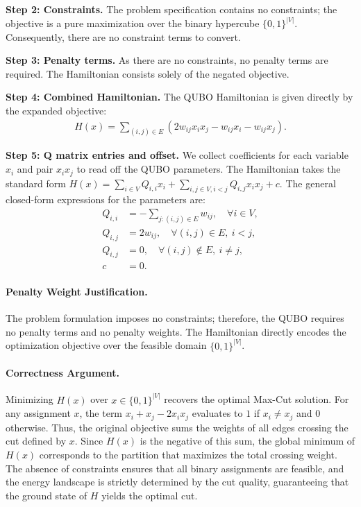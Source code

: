 \documentclass[12pt]{article}
\begin{document}
\textbf{Step 2: Constraints.}
The problem specification contains no constraints; the objective is a pure maximization over the binary hypercube $\{0,1\}^{|V|}$. Consequently, there are no constraint terms to convert.

\textbf{Step 3: Penalty terms.}
As there are no constraints, no penalty terms are required. The Hamiltonian consists solely of the negated objective.

\textbf{Step 4: Combined Hamiltonian.}
The QUBO Hamiltonian is given directly by the expanded objective:
\begin{align}
H(x) = \sum_{(i,j) \in E} \left( 2w_{ij}x_ix_j - w_{ij}x_i - w_{ij}x_j \right).
\end{align}

\textbf{Step 5: Q matrix entries and offset.}
We collect coefficients for each variable $x_i$ and pair $x_ix_j$ to read off the QUBO parameters. The Hamiltonian takes the standard form $H(x) = \sum_{i \in V} Q_{i,i}x_i + \sum_{i,j \in V, i < j} Q_{i,j}x_ix_j + c$. The general closed-form expressions for the parameters are:
\begin{align}
Q_{i,i} &= -\sum_{j : (i,j) \in E} w_{ij}, \quad \forall i \in V, \\
Q_{i,j} &= 2w_{ij}, \quad \forall (i,j) \in E, \ i < j, \\
Q_{i,j} &= 0, \quad \forall (i,j) \notin E, \ i \neq j, \\
c &= 0.
\end{align}

\paragraph{Penalty Weight Justification.}
The problem formulation imposes no constraints; therefore, the QUBO requires no penalty terms and no penalty weights. The Hamiltonian directly encodes the optimization objective over the feasible domain $\{0,1\}^{|V|}$.

\paragraph{Correctness Argument.}
Minimizing $H(x)$ over $x \in \{0,1\}^{|V|}$ recovers the optimal Max-Cut solution. For any assignment $x$, the term $x_i + x_j - 2x_ix_j$ evaluates to $1$ if $x_i \neq x_j$ and $0$ otherwise. Thus, the original objective sums the weights of all edges crossing the cut defined by $x$. Since $H(x)$ is the negative of this sum, the global minimum of $H(x)$ corresponds to the partition that maximizes the total crossing weight. The absence of constraints ensures that all binary assignments are feasible, and the energy landscape is strictly determined by the cut quality, guaranteeing that the ground state of $H$ yields the optimal cut.
\end{document}
